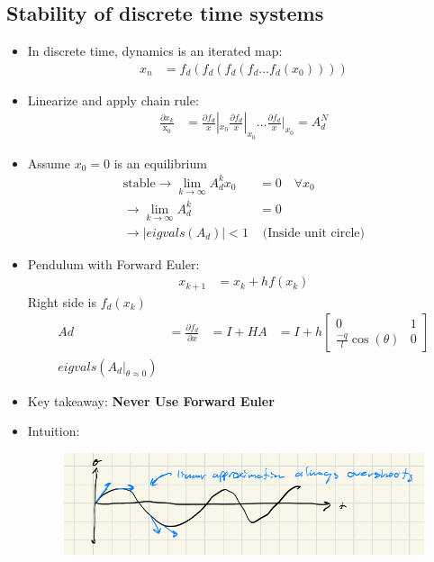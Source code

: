 \documentclass[11pt]{article}
\begin{document}
\subsection{Stability of discrete time systems}
\begin{itemize}
    \item In discrete time, dynamics is an iterated map:
    \begin{align*}
        x_n &= f_d(f_d(f_d(f_d\dots f_d(x_0))))
    \end{align*}
    \item Linearize and apply chain rule:
    \begin{align*}
        \frac{\partial x_k}{\operatorname{x_0}} &= \frac{\partial f_d}{x}|_{x_0}\frac{\partial f_d}{x}|_{x_0} \dots \frac{\partial f_d}{x}|_{x_0} = A_d^N
    \end{align*}
    \item Assume $x_0 = 0$ is an equilibrium
    \begin{align*}
        \text{stable} \rightarrow \lim_{k\rightarrow \infty} A_d^kx_0 &= 0\quad \forall x_0
        \\
        \rightarrow \lim_{k\rightarrow\infty} A_d^k &= 0
        \\
        \rightarrow |eigvals(A_d)| < 1 & \text{    (Inside unit circle)}
    \end{align*}
    \item Pendulum with Forward Euler:
    \begin{align*}
        x_{k+1} &= x_k + hf(x_k)
    \end{align*}
    Right side is $f_d(x_k)$
    \begin{align*}
        Ad &= \frac{\partial f_d}{\partial x} &= I + HA &= I + h\begin{bmatrix}
            0 & 1 \\
            \frac{-q}{l}\cos(\theta) & 0
        \end{bmatrix}
        \\
        eigvals(A_d|_{\theta\approx 0})
    \end{align*}
    \item Key takeaway: \textbf{Never Use Forward Euler}
    \item Intuition:
    \begin{figure}[H]
        \centering
        \includegraphics[width=0.75\linewidth]{lecture_2_4.png}

\end{figure}
\end{itemize}
\end{document}
